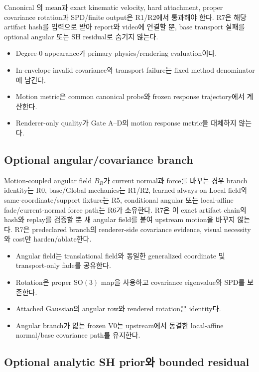 \documentclass[10pt]{article}
\begin{document}
Canonical 의 mean과 exact kinematic velocity, hard attachment,
proper covariance rotation과 SPD/finite output은 R1/R2에서 통과해야 한다. R7은 해당 artifact hash를
입력으로 받아 report와 video에 연결할 뿐, base transport 실패를 optional angular 또는 SH residual로 숨기지 않는다.

\begin{itemize}
  \item Degree-0 appearance가 primary physics/rendering evaluation이다.
  \item In-envelope invalid covariance와 transport failure는 fixed method denominator에 남긴다.
  \item Motion metric은 common canonical probe와 frozen response trajectory에서 계산한다.
  \item Renderer-only quality가 Gate A--D의 motion response metric을 대체하지 않는다.
\end{itemize}

\subsection{Optional angular/covariance branch}

Motion-coupled angular field \(B_R\)가 current normal과 force를 바꾸는 경우 branch identity는 R0,
base/Global mechanics는 R1/R2, learned always-on Local field와 same-coordinate/support fixture는 R5,
conditional angular 또는 local-affine fade/current-normal force path는 R6가 소유한다.
R7은 이 exact artifact chain의 hash와 replay를 검증할 뿐 새 angular field를 붙여 upstream motion을 바꾸지 않는다.
R7은 predeclared branch의 renderer-side covariance evidence, visual necessity와 cost만 harden/ablate한다.

\begin{itemize}
  \item Angular field는 translational field와 동일한 generalized coordinate 및 transport-only fade를 공유한다.
  \item Rotation은 proper \(\mathrm{SO}(3)\) map을 사용하고 covariance eigenvalue와 SPD를 보존한다.
  \item Attached Gaussian의 angular row와 rendered rotation은 identity다.
  \item Angular branch가 없는 frozen V0는 upstream에서 동결한 local-affine normal/base covariance path를 유지한다.
\end{itemize}

\subsection{Optional analytic SH prior와 bounded residual}
\end{document}
